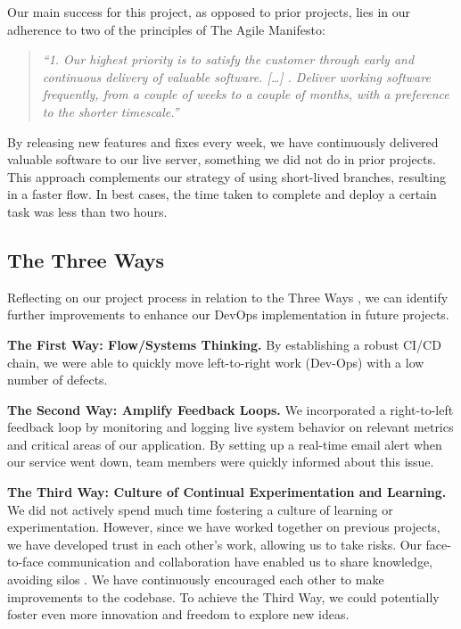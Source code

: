 Our main success for this project, as opposed to prior projects, lies in our adherence to two of the principles of The Agile Manifesto:

\begin{quote}
    \textit{“1. Our highest priority is to satisfy the customer through early and continuous delivery of valuable software. […] . Deliver working software frequently, from a couple of weeks to a couple of months, with a preference to the shorter timescale.”} \cite{agilemanifesto}
\end{quote}

By releasing new features and fixes every week, we have continuously delivered valuable software to our live server, something we did not do in prior projects. This approach complements our strategy of using short-lived branches, resulting in a faster flow. In best cases, the time taken to complete and deploy a certain task was less than two hours. 

\subsection{The Three Ways}

Reflecting on our project process in relation to the Three Ways \cite{DevOps_gates}, we can identify further improvements to enhance our DevOps implementation in future projects.

\textbf{The First Way: Flow/Systems Thinking.} By establishing a robust CI/CD chain, we were able to quickly move left-to-right work (Dev-Ops) with a low number of defects.

\textbf{The Second Way: Amplify Feedback Loops.} We incorporated a right-to-left feedback loop by monitoring and logging live system behavior on relevant metrics and critical areas of our application. By setting up a real-time email alert when our service went down, team members were quickly informed about this issue.

\textbf{The Third Way: Culture of Continual Experimentation and Learning.} We did not actively spend much time fostering a culture of learning or experimentation. However, since we have worked together on previous projects, we have developed trust in each other's work, allowing us to take risks. Our face-to-face communication and collaboration have enabled us to share knowledge, avoiding silos \cite{agilemanifesto}. We have continuously encouraged each other to make improvements to the codebase. To achieve the Third Way, we could potentially foster even more innovation and freedom to explore new ideas.